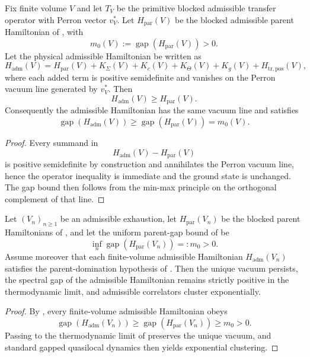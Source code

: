 
\begin{theorem}[Parent-Hamiltonian domination with \texorpdfstring{$\eta=0$}{eta=0}]
\label{lem:norm-stable-gap-parent-path}
\label{thm:eta-zero-parent-domination}
Fix finite volume $V$ and let $T_V$ be the primitive blocked admissible transfer operator with
Perron vector $v_V^\ast$. Let $H_{\mathrm{par}}(V)$ be the blocked admissible parent Hamiltonian of
, with
\[
m_0(V):=\operatorname{gap}(H_{\mathrm{par}}(V))>0.
\]
Let the physical admissible Hamiltonian be written as
\[
H_{\mathrm{adm}}(V)
=
H_{\mathrm{par}}(V)+K_\Sigma(V)+K_c(V)+K_\Theta(V)+K_g(V)+H_{\mathrm{tr,pos}}(V),
\]
where each added term is positive semidefinite and vanishes on the Perron vacuum line generated by
$v_V^\ast$. Then
\[
H_{\mathrm{adm}}(V)\ge H_{\mathrm{par}}(V).
\]
Consequently the admissible Hamiltonian has the same vacuum line and satisfies
\[
\operatorname{gap}(H_{\mathrm{adm}}(V))
\ge
\operatorname{gap}(H_{\mathrm{par}}(V))
=
m_0(V).
\]
\end{theorem}

\begin{proof}
Every summand in
\[
H_{\mathrm{adm}}(V)-H_{\mathrm{par}}(V)
\]
is positive semidefinite by construction and annihilates the Perron vacuum line, hence the operator
inequality is immediate and the ground state is unchanged. The gap bound then follows from the
min-max principle on the orthogonal complement of that line.
\end{proof}

\begin{theorem}
\label{thm:gap-stability-thermo-limit}
Let $(V_n)_{n\ge 1}$ be an admissible exhaustion, let $H_{\mathrm{par}}(V_n)$ be the blocked
parent Hamiltonians of , and let the uniform parent-gap
bound of  be
\[
\inf_n \operatorname{gap}(H_{\mathrm{par}}(V_n))=:m_0>0.
\]
Assume moreover that each finite-volume admissible Hamiltonian $H_{\mathrm{adm}}(V_n)$ satisfies
the parent-domination hypothesis of . Then the unique vacuum
persists, the spectral gap of the admissible Hamiltonian remains strictly positive in the
thermodynamic limit, and admissible
correlators cluster exponentially.
\end{theorem}

\begin{proof}
By , every finite-volume admissible Hamiltonian obeys
\[
\operatorname{gap}(H_{\mathrm{adm}}(V_n))
\ge
\operatorname{gap}(H_{\mathrm{par}}(V_n))
\ge
m_0>0.
\]
Passing to the thermodynamic limit of  preserves the unique vacuum,
and standard gapped quasilocal dynamics then yields exponential clustering.
\end{proof}

